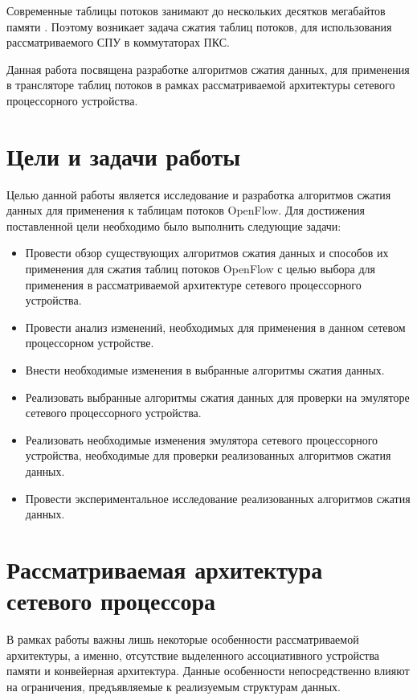 \documentclass[a4paper, 12pt, titlepage, finall]{extreport}
\begin{document}
        Современные таблицы потоков занимают до нескольких десятков мегабайтов памяти \cite{rottenstreich2016optimal}. Поэтому возникает задача сжатия таблиц потоков,
        для использования рассматриваемого СПУ в коммутаторах ПКС.

        Данная работа посвящена разработке алгоритмов сжатия данных, для применения в трансляторе таблиц
        потоков в рамках рассматриваемой архитектуры сетевого процессорного устройства.

    \chapter{Цели и задачи работы}
        Целью данной работы является исследование и разработка алгоритмов сжатия данных для применения к таблицам потоков OpenFlow. Для достижения поставленной цели
        необходимо было выполнить следующие задачи:
        \begin{itemize}
            \item Провести обзор существующих алгоритмов сжатия данных и способов их применения для сжатия таблиц потоков OpenFlow с целью выбора 
                для применения в рассматриваемой архитектуре сетевого процессорного устройства.
            \item Провести анализ изменений, необходимых для применения в данном сетевом процессорном устройстве.
            \item Внести необходимые изменения в выбранные алгоритмы сжатия данных.
            \item Реализовать выбранные алгоритмы сжатия данных для проверки на эмуляторе сетевого процессорного устройства.
            \item Реализовать необходимые изменения эмулятора сетевого процессорного устройства, необходимые для проверки реализованных алгоритмов
                сжатия данных.
            \item Провести экспериментальное исследование реализованных алгоритмов сжатия данных.
        \end{itemize}
    \chapter{Рассматриваемая архитектура сетевого процессора}
        \label{chapt:arch}
        В рамках работы важны лишь некоторые особенности рассматриваемой архитектуры, а именно, отсутствие выделенного ассоциативного устройства памяти и конвейерная архитектура. 
        Данные особенности непосредственно влияют на ограничения, предъявляемые к реализуемым структурам данных.
\end{document}
